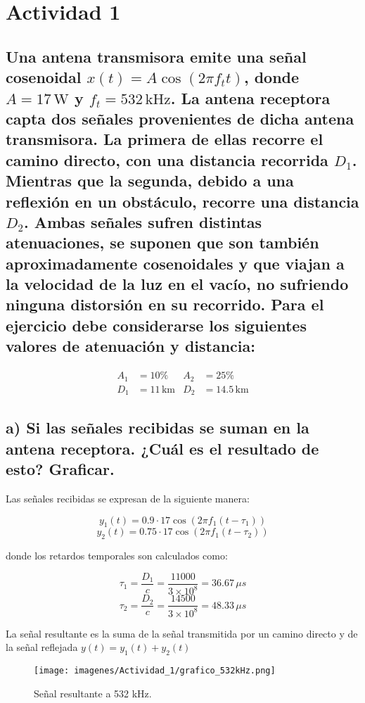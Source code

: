 \section{Actividad 1}

\subsection*{Una antena transmisora emite una señal cosenoidal \( x(t) = A \cos(2\pi f_t t) \), donde \( A = 17 \, \text{W} \) y \( f_t = 532 \, \text{kHz} \). 
La antena receptora capta dos señales provenientes de dicha antena transmisora. La primera de ellas recorre el camino directo, con una distancia recorrida 
\( D_1 \). Mientras que la segunda, debido a una reflexión en un obstáculo, recorre una distancia \( D_2 \). Ambas señales sufren distintas atenuaciones, se 
suponen que son también aproximadamente cosenoidales y que viajan a la velocidad de la luz en el vacío, no sufriendo ninguna distorsión en su recorrido. Para 
el ejercicio debe considerarse los siguientes valores de atenuación y distancia:}

\begin{align*}
    A_1 &= 10\% & A_2 &= 25\% \\
    D_1 &= 11 \, \text{km} & D_2 &= 14.5 \, \text{km}
\end{align*}

\subsection*{a) Si las señales recibidas se suman en la antena receptora. ¿Cuál es el resultado de esto? Graficar. }

Las señales recibidas se expresan de la siguiente manera:

    \[
        y_1(t) = 0.9 \cdot 17 \cos(2\pi f_1 (t - \tau_1))
        \]
        \[
        y_2(t) = 0.75 \cdot 17 \cos(2\pi f_1 (t - \tau_2))
    \]

donde los retardos temporales son calculados como:

    \[
        \tau_1 = \frac{D_1}{c} = \frac{11000}{3 \times 10^8} = 36.67 \, \mu s
        \]
        \[
        \tau_2 = \frac{D_2}{c} = \frac{14500}{3 \times 10^8} = 48.33 \, \mu s
    \]

La señal resultante es la suma de la señal transmitida por un camino directo y de la señal reflejada \(y(t) = y_1(t) + y_2(t)\) 
\bigskip


\begin{figure}[H]
    \centering
        \texttt{[image: imagenes/Actividad\_1/grafico\_532kHz.png]}
        \caption{Señal resultante a 532 kHz.}
        \label{fig:532kHz}
    \end{figure}
\bigskip

